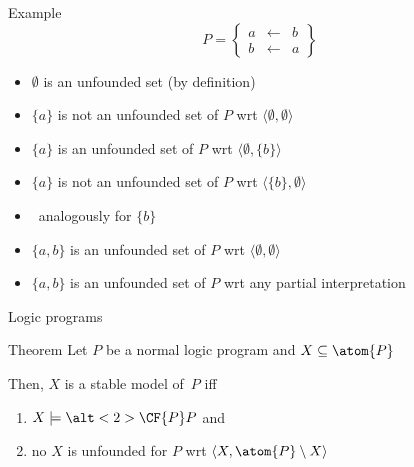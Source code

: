 \begin{frame}{Example}
\[
P
=
\left\{
  \begin{array}{lcl}
    a &\leftarrow & b \\
    b &\leftarrow & a
  \end{array}
\right\}
\]
\medskip
\begin{itemize}
\item<2-> $\emptyset$ is an unfounded set (by definition)
\smallskip
\item<3-> $\{a\}$ is not an unfounded set of $P$ wrt $\langle\emptyset,\emptyset\rangle$
\item<4-> $\{a\}$ is     an unfounded set of $P$ wrt $\langle\emptyset,\{b\}\rangle$
\item<5-> $\{a\}$ is not an unfounded set of $P$ wrt $\langle\{b\},\emptyset\rangle$
\smallskip
\item<6>[]\itarrow\ analogously for $\{b\}$
\smallskip
\item<7-> $\{a,b\}$ is     an unfounded set of $P$ wrt $\langle\emptyset,\emptyset\rangle$
\item<8-> $\{a,b\}$ is     an unfounded set of $P$ wrt any partial interpretation
\end{itemize}

\end{frame}
\begin{frame}{Logic programs}
  \bigskip
  \begin{center}
    \begin{minipage}[t]{0.92\linewidth}
      \begin{block}{ Theorem}
        Let $P$ be a normal logic program and $X\subseteq\atom{P}$
        \par\medskip
        Then, $X$ is a stable model of~$P$ iff
        \smallskip
        \begin{enumerate}
        \item $X\models\alt<2>{\CF{P}}{P}$ and
        \item no  $X$ is unfounded for $P$ wrt $\langle X,\atom{P}\setminus X \rangle$
        \end{enumerate}
      \end{block}
    \end{minipage}
  \end{center}
  \nocite{saczan90a,lee05a}
\end{frame}
